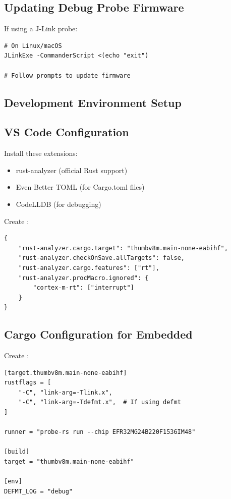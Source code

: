 \subsection{Updating Debug Probe Firmware}
\label{subsec:update-firmware}

If using a J-Link probe:

\begin{verbatim}
# On Linux/macOS
JLinkExe -CommanderScript <(echo "exit")

# Follow prompts to update firmware
\end{verbatim}

\subsection{Development Environment Setup}
\label{sec:dev-env-setup}

\subsection{VS Code Configuration}
\label{subsec:vscode-setup}

Install these extensions:
\begin{itemize}
    \item rust-analyzer (official Rust support)
    \item Even Better TOML (for Cargo.toml files)
    \item CodeLLDB (for debugging)
\end{itemize}

Create :
\begin{verbatim}
{
    "rust-analyzer.cargo.target": "thumbv8m.main-none-eabihf",
    "rust-analyzer.checkOnSave.allTargets": false,
    "rust-analyzer.cargo.features": ["rt"],
    "rust-analyzer.procMacro.ignored": {
        "cortex-m-rt": ["interrupt"]
    }
}
\end{verbatim}

\subsection{Cargo Configuration for Embedded}
\label{subsec:cargo-config}

Create :
\begin{verbatim}
[target.thumbv8m.main-none-eabihf]
rustflags = [
    "-C", "link-arg=-Tlink.x",
    "-C", "link-arg=-Tdefmt.x",  # If using defmt
]

runner = "probe-rs run --chip EFR32MG24B220F1536IM48"

[build]
target = "thumbv8m.main-none-eabihf"

[env]
DEFMT_LOG = "debug"
\end{verbatim}

